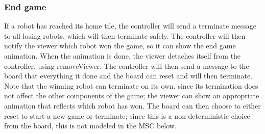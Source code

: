 	\subsubsection{End game}
	\begin{minipage}{\linewidth}
		If a robot has reached its home tile, the controller will send a terminate message to all losing robots, which will then terminate safely. The controller will then notify the viewer which robot won the game, so it can show the end game animation. When the animation is done, the viewer detaches itself from the controller, using removeViewer. The controller will then send a message to the board that everything it done and the board can reset and will then terminate. Note that the winning robot can terminate on its own, since its termination does not affect the other components of the game; the viewer can show an appropriate animation that reflects which robot has won. The board can then choose to either reset to start a new game or terminate; since this is a non-deterministic choice from the board, this is not modeled in the MSC below.

		
	\end{minipage}
